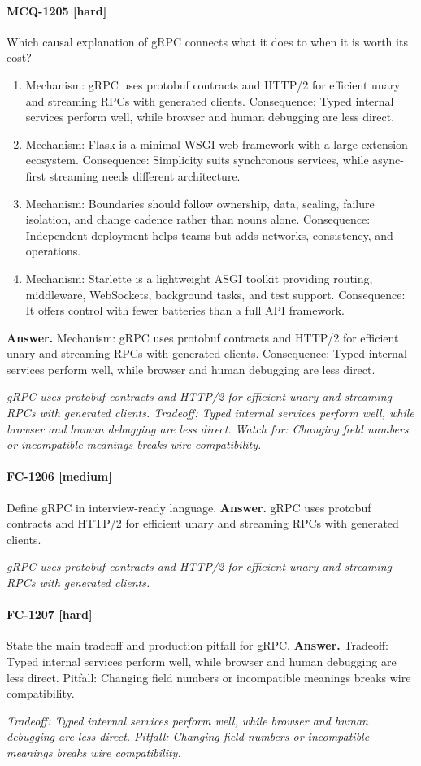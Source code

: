 \paragraph{MCQ-1205 [hard]} Which causal explanation of gRPC connects what it does to when it is worth its cost?
\begin{enumerate}[label=\Alph*.]
\item Mechanism: gRPC uses protobuf contracts and HTTP/2 for efficient unary and streaming RPCs with generated clients. Consequence: Typed internal services perform well, while browser and human debugging are less direct.
\item Mechanism: Flask is a minimal WSGI web framework with a large extension ecosystem. Consequence: Simplicity suits synchronous services, while async-first streaming needs different architecture.
\item Mechanism: Boundaries should follow ownership, data, scaling, failure isolation, and change cadence rather than nouns alone. Consequence: Independent deployment helps teams but adds networks, consistency, and operations.
\item Mechanism: Starlette is a lightweight ASGI toolkit providing routing, middleware, WebSockets, background tasks, and test support. Consequence: It offers control with fewer batteries than a full API framework.
\end{enumerate}
\noindent\textbf{Answer.} Mechanism: gRPC uses protobuf contracts and HTTP/2 for efficient unary and streaming RPCs with generated clients. Consequence: Typed internal services perform well, while browser and human debugging are less direct.
\par\textit{gRPC uses protobuf contracts and HTTP/2 for efficient unary and streaming RPCs with generated clients. Tradeoff: Typed internal services perform well, while browser and human debugging are less direct. Watch for: Changing field numbers or incompatible meanings breaks wire compatibility.}
\paragraph{FC-1206 [medium]} Define gRPC in interview-ready language.
\noindent\textbf{Answer.} gRPC uses protobuf contracts and HTTP/2 for efficient unary and streaming RPCs with generated clients.
\par\textit{gRPC uses protobuf contracts and HTTP/2 for efficient unary and streaming RPCs with generated clients.}
\paragraph{FC-1207 [hard]} State the main tradeoff and production pitfall for gRPC.
\noindent\textbf{Answer.} Tradeoff: Typed internal services perform well, while browser and human debugging are less direct. Pitfall: Changing field numbers or incompatible meanings breaks wire compatibility.
\par\textit{Tradeoff: Typed internal services perform well, while browser and human debugging are less direct. Pitfall: Changing field numbers or incompatible meanings breaks wire compatibility.}
